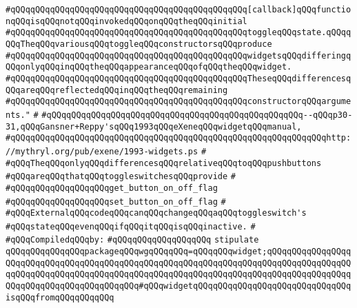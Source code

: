 \verb|#qQQqqQQqqQQqqQQqqQQqqQQqqQQqqQQqqQQqqQQqqQQqqQQq[callback]qQQqfunctionqQQqisqQQqnotqQQqinvokedqQQqonqQQqtheqQQqinitial|\newline
\verb|#qQQqqQQqqQQqqQQqqQQqqQQqqQQqqQQqqQQqqQQqqQQqqQQqtoggleqQQqstate.qQQqqQQqTheqQQqvariousqQQqtoggleqQQqconstructorsqQQqproduce|\newline
\verb|#qQQqqQQqqQQqqQQqqQQqqQQqqQQqqQQqqQQqqQQqqQQqqQQqwidgetsqQQqdifferingqQQqonlyqQQqinqQQqtheqQQqappearanceqQQqofqQQqtheqQQqwidget.|\newline
\verb|#qQQqqQQqqQQqqQQqqQQqqQQqqQQqqQQqqQQqqQQqqQQqqQQqTheseqQQqdifferencesqQQqareqQQqreflectedqQQqinqQQqtheqQQqremaining|\newline
\verb|#qQQqqQQqqQQqqQQqqQQqqQQqqQQqqQQqqQQqqQQqqQQqqQQqconstructorqQQqarguments."|\newline
\verb|#|\newline
\verb|#qQQqqQQqqQQqqQQqqQQqqQQqqQQqqQQqqQQqqQQqqQQqqQQqqQQq--qQQqp30-31,qQQqGansner+Reppy'sqQQq1993qQQqeXeneqQQqwidgetqQQqmanual,|\newline
\verb|#qQQqqQQqqQQqqQQqqQQqqQQqqQQqqQQqqQQqqQQqqQQqqQQqqQQqqQQqqQQqqQQqhttp://mythryl.org/pub/exene/1993-widgets.ps|\newline
\verb|#|\newline
\verb|#qQQqTheqQQqonlyqQQqdifferencesqQQqrelativeqQQqtoqQQqpushbuttons|\newline
\verb|#qQQqareqQQqthatqQQqtoggleswitchesqQQqprovide|\newline
\verb|#|\newline
\verb|#qQQqqQQqqQQqqQQqqQQqget_button_on_off_flag|\newline
\verb|#qQQqqQQqqQQqqQQqqQQqset_button_on_off_flag|\newline
\verb|#|\newline
\verb|#qQQqExternalqQQqcodeqQQqcanqQQqchangeqQQqaqQQqtoggleswitch's|\newline
\verb|#qQQqstateqQQqevenqQQqifqQQqitqQQqisqQQqinactive.|\newline
\verb|#|\newline
\newline
\verb|#qQQqCompiledqQQqby:|\newline
\verb|#qQQqqQQqqQQqqQQqqQQq|\newline
\newline
\verb|stipulate|\newline
\verb|qQQqqQQqqQQqqQQqpackageqQQqwgqQQqqQQq=qQQqqQQqwidget;qQQqqQQqqQQqqQQqqQQqqQQqqQQqqQQqqQQqqQQqqQQqqQQqqQQqqQQqqQQqqQQqqQQqqQQqqQQqqQQqqQQqqQQqqQQqqQQqqQQqqQQqqQQqqQQqqQQqqQQqqQQqqQQqqQQqqQQqqQQqqQQqqQQqqQQqqQQqqQQqqQQqqQQqqQQqqQQqqQQqqQQq#qQQqwidgetqQQqqQQqqQQqqQQqqQQqqQQqqQQqqQQqisqQQqfromqQQqqQQqqQQq|\newline
